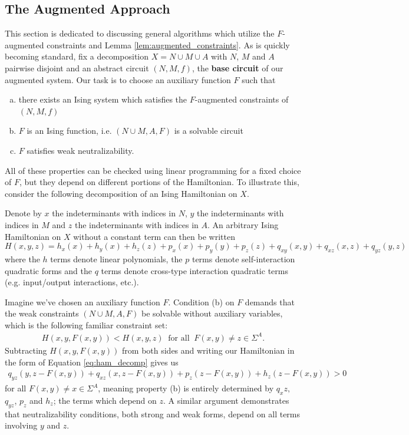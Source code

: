 \documentclass{article}
\begin{document}
\subsection{The Augmented Approach}

This section is dedicated to discussing general algorithms which utilize the $F$-augmented constraints and Lemma \ref{lem:augmented_constraints}. As is quickly becoming standard, fix a decomposition $X = N\cup M \cup A$ with $N$, $M$ and $A$ pairwise disjoint and an abstract circuit $(N,M,f)$, the \textbf{base circuit} of our augmented system. Our task is to choose an auxiliary function $F$ such that
\begin{enumerate}[(a)]
  \item there exists an Ising system which satisfies the $F$-augmented constraints of $(N,M,f)$
  \item $F$ is an Ising function, i.e. $(N\cup M, A,F)$ is a solvable circuit
  \item $F$ satisfies weak neutralizability.
\end{enumerate}
All of these properties can be checked using linear programming for a fixed choice of $F$, but they depend on different portions of the Hamiltonian. To illustrate this, consider the following decomposition of an Ising Hamiltonian on $X$.

Denote by $x$ the indeterminants with indices in $N$, $y$ the indeterminants with indices in $M$ and $z$ the indeterminants with indices in $A$. An arbitrary Ising Hamiltonian on $X$ without a constant term can then be written
\begin{equation}\label{eq:ham_decomp}
  H(x,y,z) = h_x(x) + h_y(x) + h_z(z) + p_x(x) + p_y(y) + p_z(z) + q_{xy}(x,y) + q_{xz}(x,z) + q_{yz}(y,z)
\end{equation}
where the $h$ terms denote linear polynomials, the $p$ terms denote self-interaction quadratic forms and the $q$ terms denote cross-type interaction quadratic terms (e.g. input/output interactions, etc.).

Imagine we've chosen an auxiliary function $F$. Condition (b) on $F$ demands that the weak constraints $(N\cup M, A,F)$ be solvable without auxiliary variables, which is the following familiar constraint set:
\begin{align*}
  H(x,y,F(x,y)) < H(x,y,z) ~ \text{ for all } ~ F(x,y) \neq z \in \Sigma^A.
\end{align*}
Subtracting $H(x,y,F(x,y))$ from both sides and writing our Hamiltonian in the form of Equation \ref{eq:ham_decomp} gives us
\begin{align*}
  q_{yz}(y,z - F(x,y)) + q_{xz}(x,z - F(x,y)) + p_z(z - F(x,y)) + h_z(z - F(x,y))>0
\end{align*}
for all $F(x,y) \neq x \in \Sigma^A$, meaning property (b) is entirely determined by $q_xz,$ $q_{yz}$, $p_z$ and $h_z$; the terms which depend on $z$. A similar argument demonstrates that neutralizability conditions, both strong and weak forms, depend on all terms involving $y$ and $z$.
\end{document}
